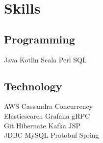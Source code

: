 \section{Skills}
\subsection{Programming}
Java \textbullet{} Kotlin \textbullet{} Scala \textbullet{} Perl \textbullet{} SQL
\sectionsep

\subsection{Technology}
AWS \textbullet{} Cassandra \textbullet{} Concurrency \\
Elasticsearch \textbullet{} Grafana \textbullet{} gRPC \\
Git \textbullet{} Hibernate \textbullet{} Kafka \textbullet{} JSP \\
JDBC \textbullet{} MySQL \textbullet{} Protobuf \textbullet{} Spring \sectionsep
